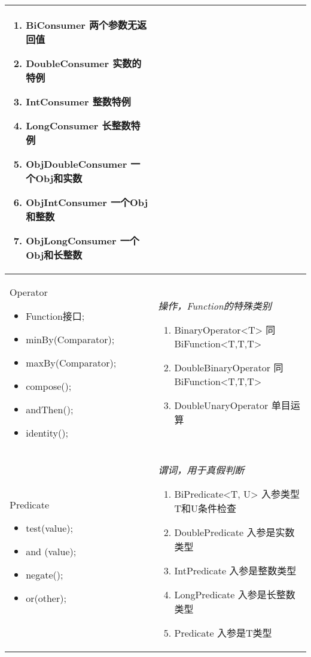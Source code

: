 \begin{longtable}{|p{4cm}|p{9cm}|}
\begin{enumerate}
		\item BiConsumer 两个参数无返回值
		\item DoubleConsumer 实数的特例
		\item IntConsumer 整数特例
		\item LongConsumer 长整数特例
		\item ObjDoubleConsumer 一个Obj和实数
		\item ObjIntConsumer 一个Obj和整数
		\item ObjLongConsumer 一个Obj和长整数
	\end{enumerate} \\
	\hline
	Operator
	\begin{itemize}
		\small
		\setlength{\itemindent}{-1.2em}
		\setlength{\itemsep}{0pt}
		\item Function接口;
		\item minBy(Comparator);
		\item maxBy(Comparator);
		\item compose();
		\item andThen();
		\item identity();
	\end{itemize} & \emph{操作，Function的特殊类别}
	\begin{enumerate}
		\setlength{\itemsep}{0pt}
		\small
		\item BinaryOperator<T> 同BiFunction<T,T,T>
		\item DoubleBinaryOperator 同BiFunction<T,T,T>
		\item DoubleUnaryOperator 单目运算
	\end{enumerate} \\
	\hline
	Predicate
	\begin{itemize}
		\small
		\setlength{\itemindent}{-1.2em}
		\setlength{\itemsep}{0pt}
		\item test(value);
		\item and (value);
		\item negate();
		\item or(other);
	\end{itemize} & \emph{谓词，用于真假判断}
	\begin{enumerate}
		\setlength{\itemsep}{0pt}
		\small
		\item BiPredicate<T, U> 入参类型T和U条件检查
		\item DoublePredicate 入参是实数类型
		\item IntPredicate 入参是整数类型
		\item LongPredicate 入参是长整数类型
		\item Predicate 入参是T类型

\end{enumerate}
\end{longtable}
